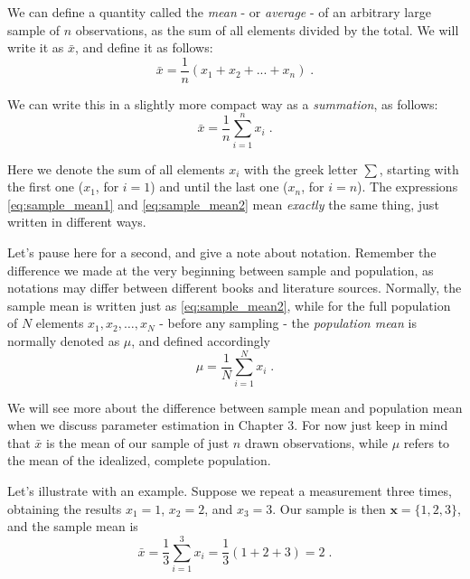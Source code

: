 \documentclass{book}
\begin{document}
\medskip

We can define a quantity called the \textit{mean} - or \textit{average} - of an arbitrary large sample of $n$ observations, as the sum of all elements divided by the total. We will write it as $\bar{x}$, and define it as follows:
\begin{equation}
	\bar{x} = \frac{1}{n} (x_{1} + x_{2} + ... + x_{n}) \; .
	\label{eq:sample_mean1}
\end{equation}

We can write this in a slightly more compact way as a \textit{summation}, as follows:
\begin{equation}
	\bar{x} = \frac{1}{n} \sum_{i = 1}^{n} x_{i} \; .
	\label{eq:sample_mean2}
\end{equation}

Here we denote the sum of all elements $x_{i}$ with the greek letter $\sum$, starting with the first one ($x_1$, for $i = 1$) and until the last one ($x_n$, for $i = n$). The expressions \eqref{eq:sample_mean1} and \eqref{eq:sample_mean2} mean \textit{exactly} the same thing, just written in different ways.

\medskip

Let's pause here for a second, and give a note about notation. Remember the difference we made at the very beginning between sample and population, as notations may differ between different books and literature sources. Normally, the sample mean is written just as \eqref{eq:sample_mean2}, while for the full population of $N$ elements $x_1, x_2, \dots, x_N$ - before any sampling - the \textit{population mean} is normally denoted as $\mu$, and defined accordingly
\begin{equation}
	\mu = \frac{1}{N} \sum_{i=1}^{N} x_i \; .
	\label{eq:population_mean}
\end{equation}

We will see more about the difference between sample mean and population mean when we discuss parameter estimation in Chapter 3. For now just keep in mind that $\bar{x}$ is the mean of our sample of just $n$ drawn observations, while $\mu$ refers to the mean of the idealized, complete population.

\medskip

Let's illustrate with an example. Suppose we repeat a measurement three times, obtaining the results $x_1 = 1$, $x_2 = 2$, and $x_3 = 3$. Our sample is then $\textbf{x} = \{1, 2, 3\}$, and the sample mean is
\begin{equation}
	\bar{x} = \frac{1}{3} \sum_{i = 1}^{3} x_{i} = \frac{1}{3} (1 + 2 + 3) = 2 \; . \nonumber
\end{equation}
\end{document}
